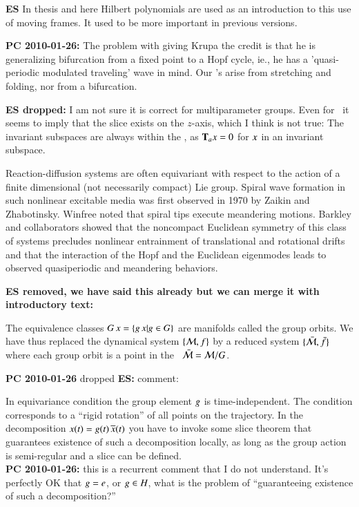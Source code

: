 {\bf ES} In thesis and here Hilbert
polynomials are used as an introduction to this use of moving
frames. It used to be more important in previous versions.

{\bf PC 2010-01-26:}
   The problem with giving Krupa the credit is that he is
   generalizing bifurcation from a fixed point to a Hopf
   cycle, ie., he has a 'quasi-periodic modulated traveling' wave in mind.
   Our \rpo's arise from stretching and folding, nor from a
   bifurcation.

{\bf ES dropped: }
I am not sure it is correct for multiparameter groups. Even
for \cLe\ it seems to imply that the slice exists on the $z$-axis,
which I think is not true: The
invariant subspaces are always within the \slice, as $\mathbf{T}_a
 x =0$ for $x$ in an invariant subspace.

Reaction-diffusion systems are often equivariant with respect
to the action of a finite dimensional (not necessarily
compact) Lie group. Spiral wave formation in such nonlinear
excitable media was first observed in 1970 by Zaikin and
Zhabotinsky. Winfree
noted that spiral tips execute meandering motions. Barkley
and collaborators showed that the
noncompact Euclidean symmetry of this class of systems
precludes nonlinear entrainment of translational and
rotational drifts and that the interaction of the Hopf and
the Euclidean eigenmodes leads to observed quasiperiodic and
meandering behaviors.

{\bf ES removed, we have said this already but we can merge it
with introductory text:}

The equivalence classes $G \, x = \{  g \, x
| g \in G \}$ are manifolds called the group
orbits. We have thus replaced the dynamical system
$\{{\cal M},f\}$ by a reduced system $\{\bar{{\cal M}},\bar{f}\}$ where
each  group orbit is a point in the \reducedsp\
$\bar{{\cal M}}={\cal M}/G$.



{\bf PC 2010-01-26} dropped {\bf ES: } comment:

In equivariance condition  the group
element $g$ is time-independent. The condition
corresponds to a ``rigid rotation'' of all points on the
trajectory. In the decomposition $x(t)=
g(t)\,\overline{x}(t)$ you have to invoke some slice theorem
that guarantees existence of such a decomposition locally, as
long as the group action is semi-regular and a slice can be
defined.
\\
{\bf PC 2010-01-26:} this is a recurrent comment that I do
not understand. It's perfectly  OK that $g= e$, or
$g \in H$, what is the problem of ``guaranteeing
existence of such a decomposition?''

